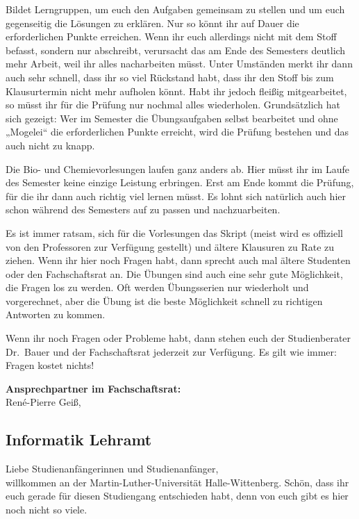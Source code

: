 Bildet Lerngruppen, um euch den Aufgaben gemeinsam zu stellen und um euch gegenseitig die Lösungen zu erklären.
Nur so könnt ihr auf Dauer die erforderlichen Punkte erreichen.
Wenn ihr euch allerdings nicht mit dem Stoff befasst, sondern nur abschreibt, verursacht das am Ende des Semesters deutlich mehr Arbeit, weil ihr alles nacharbeiten müsst.
Unter Umständen merkt ihr dann auch sehr schnell, dass ihr so viel Rückstand habt, dass ihr den Stoff bis zum Klausurtermin nicht mehr aufholen könnt. Habt ihr jedoch fleißig mitgearbeitet, so müsst ihr für die Prüfung nur nochmal alles wiederholen.
Grundsätzlich hat sich gezeigt:
Wer im Semester die Übungsaufgaben selbst bearbeitet und ohne „Mogelei“ die erforderlichen Punkte erreicht, wird die Prüfung bestehen und das auch nicht zu knapp.

Die Bio- und Chemievorlesungen laufen ganz anders ab.
Hier müsst ihr im Laufe des Semester keine einzige Leistung erbringen.
Erst am Ende kommt die Prüfung, für die ihr dann auch richtig viel lernen müsst.
Es lohnt sich natürlich auch hier schon während des Semesters auf zu passen und nachzuarbeiten.

Es ist immer ratsam, sich für die Vorlesungen das Skript (meist wird es offiziell von den Professoren zur Verfügung gestellt) und ältere Klausuren zu Rate zu ziehen.
Wenn ihr hier noch Fragen habt, dann sprecht auch mal ältere Studenten oder den Fachschaftsrat an.
Die Übungen sind auch eine sehr gute Möglichkeit, die Fragen los zu werden.
Oft werden Übungsserien nur wiederholt und vorgerechnet, aber die Übung ist die beste Möglichkeit schnell zu richtigen Antworten zu kommen.

Wenn ihr noch Fragen oder Probleme habt, dann stehen euch der Studienberater Dr.~Bauer und der Fachschaftsrat jederzeit zur Verfügung.
Es gilt wie immer: Fragen kostet nichts!

\textbf{Ansprechpartner im Fachschaftsrat:}\\
René-Pierre Geiß, 



\newpage

\subsection{Informatik Lehramt}
\label{studiengang_infolehramt}


Liebe Studienanfängerinnen und Studienanfänger,\\
willkommen an der Martin-Luther-Universität Halle-Wittenberg.
Schön, dass ihr euch gerade für diesen Studiengang entschieden habt, denn von euch gibt es hier noch nicht so viele.

